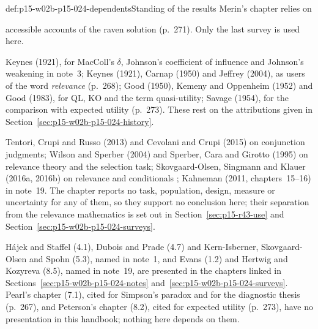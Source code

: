 \begin{proofboundary}{def:p15-w02b-p15-024-dependents}{Standing of the results Merin's chapter relies on}
\begin{description}
  accessible accounts of the raven solution (p.~271). Only the last
  survey is used here.
\item[Historical attributions.] Keynes (1921), for MacColl's \(\delta\),
  Johnson's coefficient of influence and Johnson's weakening in note~3;
  Keynes (1921), Carnap (1950) and Jeffrey (2004), as users of the word
  \emph{relevance} (p.~268); Good (1950), Kemeny and Oppenheim (1952)
  and Good (1983), for QL, KO and the term quasi-utility; Savage (1954),
  for the comparison with expected utility (p.~273). These rest on the
  attributions given in Section~\ref{sec:p15-w02b-p15-024-history}.
\item[Empirical pointers.] Tentori, Crupi and Russo (2013) and Cevolani
  and Crupi (2015) on conjunction judgments; Wilson and Sperber (2004)
  and Sperber, Cara and Girotto (1995) on relevance theory and the
  selection task; Skovgaard-Olsen, Singmann and Klauer (2016a, 2016b) on
  relevance and conditionals \cite[p.~273]{Merin2021Relevance};
  Kahneman (2011, chapters~15--16) in note~19. The chapter reports no
  task, population, design, measure or uncertainty for any of them, so
  they support no conclusion here; their separation from the relevance
  mathematics is set out in Section~\ref{sec:p15-r43-use} and
  Section~\ref{sec:p15-w02b-p15-024-surveys}.
\item[Chapters of the same handbook.] H\'ajek and Staffel (4.1), Dubois
  and Prade (4.7) and Kern-Isberner, Skovgaard-Olsen and Spohn (5.3),
  named in note~1, and Evans (1.2) and Hertwig and Kozyreva (8.5), named
  in note~19, are presented in the chapters linked in
  Sections~\ref{sec:p15-w02b-p15-024-notes}
  and~\ref{sec:p15-w02b-p15-024-surveys}. Pearl's chapter (7.1), cited
  for Simpson's paradox and for the diagnostic thesis (p.~267), and
  Peterson's chapter (8.2), cited for expected utility (p.~273), have no
  presentation in this handbook; nothing here depends on them.
\end{description}
\end{proofboundary}

